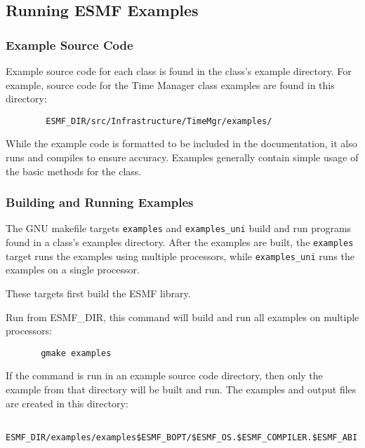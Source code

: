
\subsection{Running ESMF Examples}
\label{examples}


\subsubsection{Example Source Code}

Example source code for each class is found in the class's example
directory. For example, source code for the Time Manager class examples
are found in this directory:

\begin{verbatim}
        ESMF_DIR/src/Infrastructure/TimeMgr/examples/
\end{verbatim}

While the example code is formatted to be included in the documentation,
it also runs and compiles to ensure accuracy.  Examples generally 
contain simple usage of the basic methods for the class.

\subsubsection{Building and Running Examples}

The GNU makefile targets {\tt examples} and {\tt examples\_uni} build
and run programs found in a class's examples directory.  After the
examples are built, the {\tt examples} target runs the examples using
multiple processors, while {\tt examples\_uni} runs the examples on
a single processor.

These targets first build the ESMF library.

Run from ESMF\_DIR, this command will build and run all examples on
multiple processors:

\begin{verbatim}
       gmake examples
\end{verbatim}

If the command is run in an example source code directory, then only
the example from that directory will be built and run.  The examples
and output files are created in this directory:

\begin{verbatim}
       ESMF_DIR/examples/examples$ESMF_BOPT/$ESMF_OS.$ESMF_COMPILER.$ESMF_ABI.$ESMF_SITE/
\end{verbatim}

